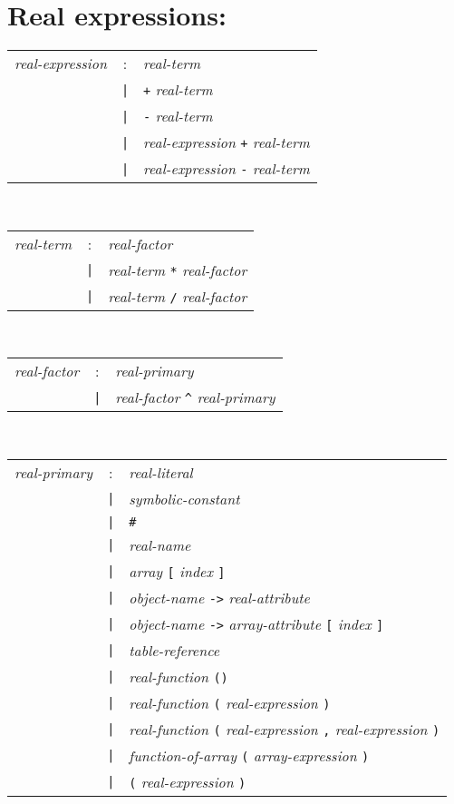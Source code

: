 \section*{Real expressions:}
\begin{tabular}{p{4cm}cl}
\textit{real-expression}
  &:& \textit{real-term} \\
  &\texttt{|}& \texttt{+} \textit{real-term} \\
  &\texttt{|}& \texttt{-} \textit{real-term} \\
  &\texttt{|}& \textit{real-expression} \texttt{+} \textit{real-term} \\
  &\texttt{|}& \textit{real-expression} \texttt{-} \textit{real-term}
\end{tabular}
\\
\begin{tabular}{p{4cm}cl}
\textit{real-term}
  &:& \textit{real-factor} \\
  &\texttt{|}& \textit{real-term} \texttt{*} \textit{real-factor} \\
  &\texttt{|}& \textit{real-term} \texttt{/} \textit{real-factor}
\end{tabular}
\\
\begin{tabular}{p{4cm}cl}
\textit{real-factor}
  &:& \textit{real-primary} \\
  &\texttt{|}& \textit{real-factor} \texttt{\^{}} \textit{real-primary}
\end{tabular}
\\
\begin{tabular}{p{4cm}cl}
\textit{real-primary}
  &:& \textit{real-literal} \\
  &\texttt{|}& \textit{symbolic-constant} \\
  &\texttt{|}& \texttt{\#} \\
  &\texttt{|}& \textit{real-name} \\
  &\texttt{|}& \textit{array} \texttt{[} \textit{index} \texttt{]} \\
  &\texttt{|}& \textit{object-name} \texttt{->} \textit{real-attribute} \\
  &\texttt{|}& \textit{object-name} \texttt{->} \textit{array-attribute}
    \texttt{[} \textit{index} \texttt{]} \\
  &\texttt{|}& \textit{table-reference} \\
  &\texttt{|}& \textit{real-function} \texttt{()} \\
  &\texttt{|}& \textit{real-function} \texttt{(} \textit{real-expression}
    \texttt{)} \\
  &\texttt{|}& \textit{real-function} \texttt{(} \textit{real-expression}
    \texttt{,} \textit{real-expression} \texttt{)} \\
  &\texttt{|}& \textit{function-of-array}
    \texttt{(} \textit{array-expression} \texttt{)} \\
  &\texttt{|}& \texttt{(} \textit{real-expression} \texttt{)}
\end{tabular}
